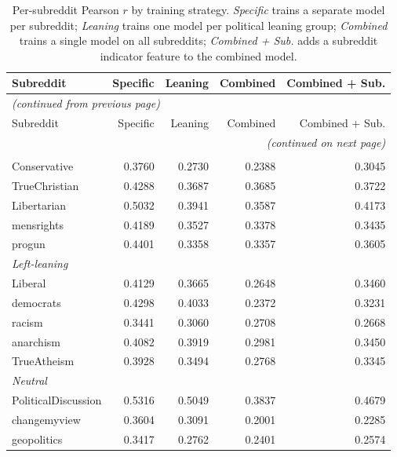 \begin{longtable}[c]{lrrrr}
\caption{Per-subreddit Pearson $r$ by training strategy. \textit{Specific} trains a separate model per subreddit; \textit{Leaning} trains one model per political leaning group; \textit{Combined} trains a single model on all subreddits; \textit{Combined + Sub.} adds a subreddit indicator feature to the combined model.}
\label{tab:per_subreddit_pearson} \\
\toprule
Subreddit & Specific & Leaning & Combined & Combined + Sub. \\
\midrule
\endfirsthead
\multicolumn{5}{l}{\small\textit{(continued from previous page)}} \\
\toprule
Subreddit & Specific & Leaning & Combined & Combined + Sub. \\
\midrule
\endhead
\midrule
\multicolumn{5}{r}{\small\textit{(continued on next page)}} \\
\endfoot
\bottomrule
\endlastfoot
\multicolumn{5}{l}{\textit{Right-leaning}} \\
\quad Conservative       & 0.3760 & 0.2730 & 0.2388 & 0.3045 \\
\quad TrueChristian      & 0.4288 & 0.3687 & 0.3685 & 0.3722 \\
\quad Libertarian        & 0.5032 & 0.3941 & 0.3587 & 0.4173 \\
\quad mensrights         & 0.4189 & 0.3527 & 0.3378 & 0.3435 \\
\quad progun             & 0.4401 & 0.3358 & 0.3357 & 0.3605 \\
\midrule
\multicolumn{5}{l}{\textit{Left-leaning}} \\
\quad Liberal            & 0.4129 & 0.3665 & 0.2648 & 0.3460 \\
\quad democrats          & 0.4298 & 0.4033 & 0.2372 & 0.3231 \\
\quad racism             & 0.3441 & 0.3060 & 0.2708 & 0.2668 \\
\quad anarchism          & 0.4082 & 0.3919 & 0.2981 & 0.3450 \\
\quad TrueAtheism        & 0.3928 & 0.3494 & 0.2768 & 0.3345 \\
\midrule
\multicolumn{5}{l}{\textit{Neutral}} \\
\quad PoliticalDiscussion & 0.5316 & 0.5049 & 0.3837 & 0.4679 \\
\quad changemyview        & 0.3604 & 0.3091 & 0.2001 & 0.2285 \\
\quad geopolitics         & 0.3417 & 0.2762 & 0.2401 & 0.2574 \\

\end{longtable}
